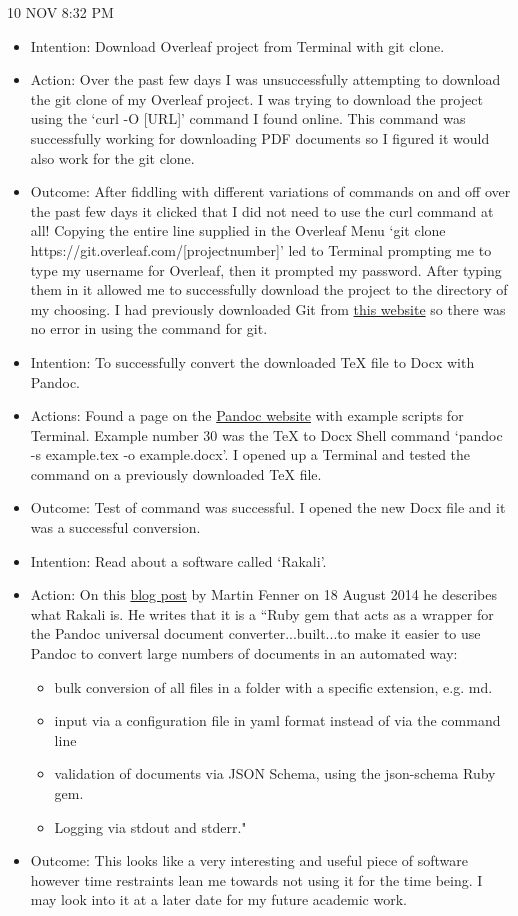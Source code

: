 \documentclass{article}
\begin{document}
10 NOV 8:32 PM

\begin{itemize}
    \item Intention: Download Overleaf project from Terminal with git clone.
    \item Action: Over the past few days I was unsuccessfully attempting to download the git clone of my Overleaf project. I was trying to download the project using the `curl -O [URL]' command I found online. This command was successfully working for downloading PDF documents so I figured it would also work for the git clone.
    \item Outcome: After fiddling with different variations of commands on and off over the past few days it clicked that I did not need to use the curl command at all! Copying the entire line supplied in the Overleaf Menu `git clone https://git.overleaf.com/[projectnumber]' led to Terminal prompting me to type my username for Overleaf, then it prompted my password. After typing them in it allowed me to successfully download the project to the directory of my choosing. I had previously downloaded Git from \href{https://git-scm.com/downloads}{this website} so there was no error in using the command for git.
    \item Intention: To successfully convert the downloaded TeX file to Docx with Pandoc.
    \item Actions: Found a page on the \href{https://pandoc.org/demos.html}{Pandoc website} with example scripts for Terminal. Example number 30 was the TeX to Docx Shell command `pandoc -s example.tex -o example.docx'. I opened up a Terminal and tested the command on a previously downloaded TeX file.
    \item Outcome: Test of command was successful. I opened the new Docx file and it was a successful conversion.
    \item Intention: Read about a software called `Rakali'.
    \item Action: On this \href{https://blog.martinfenner.org/2014/08/18/introducing-rakali/}{blog post} by Martin Fenner on 18 August 2014 he describes what Rakali is. He writes that it is a ``Ruby gem that acts as a wrapper for the Pandoc universal document converter...built...to make it easier to use Pandoc to convert large numbers of documents in an automated way:
    \begin{itemize}
        \item bulk conversion of all files in a folder with a specific extension, e.g. md.
        \item input via a configuration file in yaml format instead of via the command line
        \item validation of documents via JSON Schema, using the json-schema Ruby gem.
        \item Logging via stdout and stderr."
    \end{itemize}
    \item Outcome: This looks like a very interesting and useful piece of software however time restraints lean me towards not using it for the time being. I may look into it at a later date for my future academic work.
\end{itemize}
\end{document}
